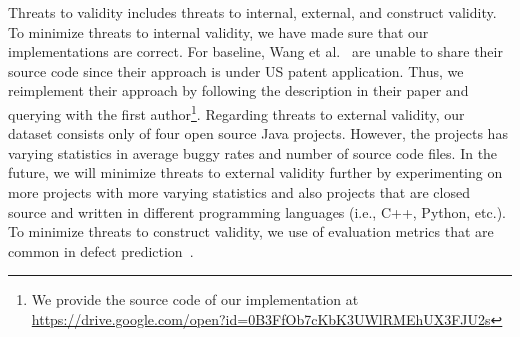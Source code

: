 {Threats to validity includes threats to internal, external, and construct validity. To minimize threats to internal validity, we have made sure that our implementations are correct. For baseline, Wang et al.~\cite{wang2016automatically} are unable to share their source code since their approach is under US patent application. Thus, we reimplement their approach by following the description in their paper and querying with the first author\footnote{We provide the source code of our implementation at \url{https://drive.google.com/open?id=0B3FfOb7cKbK3UWlRMEhUX3FJU2s}}. Regarding threats to external validity, our dataset consists only of four open source Java projects. However, the projects has varying statistics in average buggy rates and number of source code files. In the future, we will minimize threats to external validity further by experimenting on more projects with more varying statistics and also projects that are closed source and written in different programming languages (i.e., C++, Python, etc.). To minimize threats to construct validity, we use of evaluation metrics that are common in defect prediction~\cite{menzies2007data, menzies2010defect, nam2013transfer}.
}


